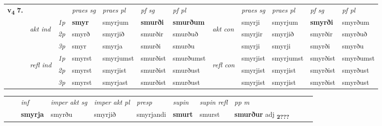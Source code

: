 \begin{tabular}{llllllllllll} \toprule
\multirow{4}{*}{{{\textbf{v{\textsubscript{4}}} \Large{\textbf{7.}}}}}  & &   &  \textit{praes sg}  & \textit{praes pl}  &\textit{ pf sg} & \textit{pf pl} &  &  \textit{praes sg}  & \textit{praes pl}  & \textit{pf sg} & \textit{pf pl } \\*
	\cmidrule{4-7} \cmidrule{9-12}
 & \multirow{3}{*}{\begin{turn}{90}\textit{akt ind}\end{turn}} & {\textit{1p}} & \textbf{smyr} & smyrjum    & \textbf{smurði} & \textbf{smurðum} & \multirow{3}{*}{\begin{turn}{90}\textit{akt con}\end{turn}} &smyrji & smyrjum & \textbf{smyrði} & smyrðum\\*
& &  {\textit{2p}} &  smyrð  & smyrjið   & smurðir & smurðuð & & smyrjir & smyrjið & smyrðir & smyrðuð \\*
& &  {\textit{3p}} & smyr & smyrja   & smurði & smurðu & & smyrji & smyrji& smyrði & smyrðu  \\*
\cmidrule{4-7} \cmidrule{9-12}
 &\multirow{3}{*}{\begin{turn}{90}\textit{refl ind}\end{turn}} & {\textit{1p}} & smyrst & smyrjumst    & smurðist & smurðumst & \multirow{3}{*}{\begin{turn}{90}\textit{refl con}\end{turn}}  &smyrjist & smyrjumst & smyrðist & smyrðumst\\*
 &&  {\textit{2p}} &  smyrst  & smyrjist   & smurðist & smurðust & &smyrjist & smyrjist & smyrðist & smyrðust \\*
& &  {\textit{3p}} & smyrst & smyrjast   & smurðist & smurðust & & smyrjist & smyrjist& smyrðist & smyrðust  \\*
\cmidrule{4-7} \cmidrule{9-12}
\end{tabular}


\begin{tabular}{llllllllllll}
 & & \textit{inf} & \textit{imper akt sg} & \textit{imper akt pl}   & \textit{presp} & \textit{supin} & \textit{supin refl} & \textit{pp m}     \\*
  & & \textbf{smyrja} & smyrðu  & smyrjið   & smyrjandi &  \textbf{smurt} & smurst & \textbf{smurður} adj \textbf{\textsubscript{2???}} \\*
\cmidrule{1-12}
\end{tabular}



